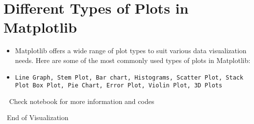 \documentclass[serif, aspectratio=169]{beamer}
\begin{document}
\section{Different Types of Plots in Matplotlib}
\begin{frame}
    \begin{itemize}
       \item Matplotlib offers a wide range of plot types to suit various data visualization needs. Here are some of the most commonly used types of plots in Matplotlib:
       \item \texttt{\color{red}Line Graph, Stem Plot, Bar chart, \newline Histograms, Scatter Plot, Stack Plot \newline
       Box Plot, Pie Chart, Error Plot, Violin Plot, 3D Plots }
    \end{itemize}
\end{frame}


\begin{frame}
    \begin{center}
        {\Huge\ \color{red} Check notebook for more information and codes}
    \end{center}
\end{frame}
\begin{frame}
    \begin{center}
        {\Huge\ End of Visualization}
    \end{center}
\end{frame}
\end{document}
